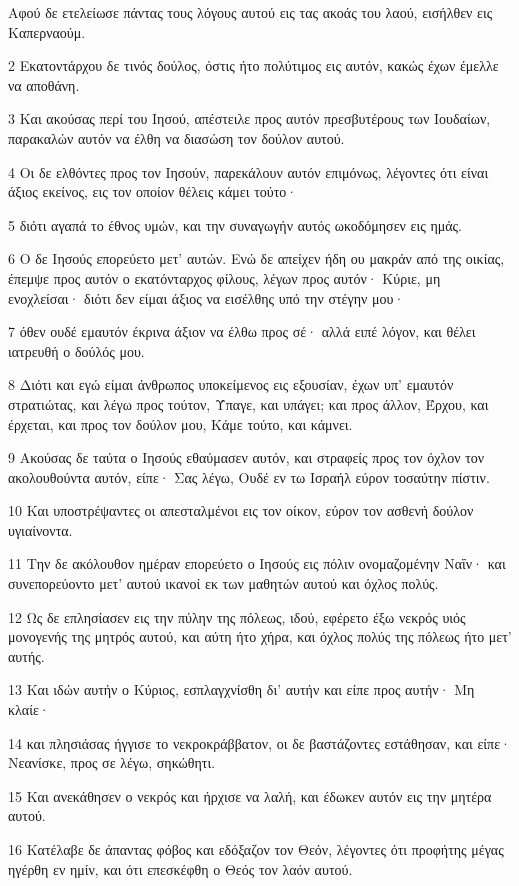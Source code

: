 \par Αφού δε ετελείωσε πάντας τους λόγους αυτού εις τας ακοάς του λαού, εισήλθεν εις Καπερναούμ.
\par 2 Εκατοντάρχου δε τινός δούλος, όστις ήτο πολύτιμος εις αυτόν, κακώς έχων έμελλε να αποθάνη.
\par 3 Και ακούσας περί του Ιησού, απέστειλε προς αυτόν πρεσβυτέρους των Ιουδαίων, παρακαλών αυτόν να έλθη να διασώση τον δούλον αυτού.
\par 4 Οι δε ελθόντες προς τον Ιησούν, παρεκάλουν αυτόν επιμόνως, λέγοντες ότι είναι άξιος εκείνος, εις τον οποίον θέλεις κάμει τούτο·
\par 5 διότι αγαπά το έθνος υμών, και την συναγωγήν αυτός ωκοδόμησεν εις ημάς.
\par 6 Ο δε Ιησούς επορεύετο μετ' αυτών. Ενώ δε απείχεν ήδη ου μακράν από της οικίας, έπεμψε προς αυτόν ο εκατόνταρχος φίλους, λέγων προς αυτόν· Κύριε, μη ενοχλείσαι· διότι δεν είμαι άξιος να εισέλθης υπό την στέγην μου·
\par 7 όθεν ουδέ εμαυτόν έκρινα άξιον να έλθω προς σέ· αλλά ειπέ λόγον, και θέλει ιατρευθή ο δούλός μου.
\par 8 Διότι και εγώ είμαι άνθρωπος υποκείμενος εις εξουσίαν, έχων υπ' εμαυτόν στρατιώτας, και λέγω προς τούτον, Ύπαγε, και υπάγει; και προς άλλον, Έρχου, και έρχεται, και προς τον δούλον μου, Κάμε τούτο, και κάμνει.
\par 9 Ακούσας δε ταύτα ο Ιησούς εθαύμασεν αυτόν, και στραφείς προς τον όχλον τον ακολουθούντα αυτόν, είπε· Σας λέγω, Ουδέ εν τω Ισραήλ εύρον τοσαύτην πίστιν.
\par 10 Και υποστρέψαντες οι απεσταλμένοι εις τον οίκον, εύρον τον ασθενή δούλον υγιαίνοντα.
\par 11 Την δε ακόλουθον ημέραν επορεύετο ο Ιησούς εις πόλιν ονομαζομένην Ναΐν· και συνεπορεύοντο μετ' αυτού ικανοί εκ των μαθητών αυτού και όχλος πολύς.
\par 12 Ως δε επλησίασεν εις την πύλην της πόλεως, ιδού, εφέρετο έξω νεκρός υιός μονογενής της μητρός αυτού, και αύτη ήτο χήρα, και όχλος πολύς της πόλεως ήτο μετ' αυτής.
\par 13 Και ιδών αυτήν ο Κύριος, εσπλαγχνίσθη δι' αυτήν και είπε προς αυτήν· Μη κλαίε·
\par 14 και πλησιάσας ήγγισε το νεκροκράββατον, οι δε βαστάζοντες εστάθησαν, και είπε· Νεανίσκε, προς σε λέγω, σηκώθητι.
\par 15 Και ανεκάθησεν ο νεκρός και ήρχισε να λαλή, και έδωκεν αυτόν εις την μητέρα αυτού.
\par 16 Κατέλαβε δε άπαντας φόβος και εδόξαζον τον Θεόν, λέγοντες ότι προφήτης μέγας ηγέρθη εν ημίν, και ότι επεσκέφθη ο Θεός τον λαόν αυτού.
